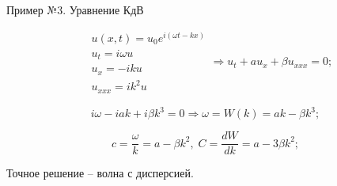 \documentclass[10pt,xcolor=pst,aspectratio=169]{beamer}
\begin{document}
\begin{frame}{Пример №3. Уравнение КдВ}

    \transdissolve[duration=0.1]
    \justifying
    \large

    \[
        \boxed{
            \begin{split}
                &u \left( x, t \right) = u_{0} e^{i \left( \omega t - k x \right)} \\
                &u_{t} = i \omega u \\
                &u_{x} = - i k u \\
                &u_{xxx} = i k^{2} u
            \end{split}
        }
        \Rightarrow
        \boxed{
            u_{t} + a u_{x} + \beta u_{xxx} = 0
        };
    \]

    \[
        i \omega - i a k + i \beta k^{3} = 0
        \Rightarrow
        \omega = W \left( k \right) = a k - \boxed{\beta k^{3}};
    \]

    \[
        c = \frac{\omega}{k} = a - \boxed{ \beta k^{2}}, \; C = \frac{d W}{d k} = a - \boxed{3 \beta k^{2}};
    \]

    \begin{center}
        Точное решение -- волна с дисперсией.
    \end{center}

\end{frame}
\end{document}

